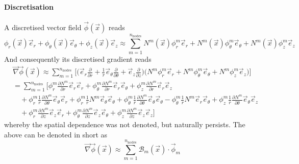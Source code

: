 \documentclass[times,namecite]{goose-article}
\begin{document}
\paragraph{Discretisation}

A discretised vector field $\vec{\phi}(\vec{x})$ reads
\begin{equation}
  \phi_r (\vec{x}) \vec{e}_r + \phi_\theta (\vec{x}) \vec{e}_\theta + \phi_z (\vec{x}) \vec{e}_z
  \approx
  \sum\limits_{m=1}^{n_\mathrm{nodes}}
  N^m (\vec{x}) \phi^{m}_{r}       \vec{e}_r      +
  N^m (\vec{x}) \phi^{m}_{\theta}  \vec{e}_\theta +
  N^m (\vec{x}) \phi^{m}_{z}       \vec{e}_z
\end{equation}
And consequently its discretised gradient reads
\begin{align}
  &\vec{\nabla} \vec{\phi} (\vec{x})
  \approx
  \sum\limits_{m=1}^{n_\mathrm{nodes}}
  \Bigg[
  \bigg(
  \vec{e}_r \frac{\partial}{\partial r} +
  \frac{1}{r} \vec{e}_\theta \frac{\partial}{\partial \theta} +
  \vec{e}_z \frac{\partial}{\partial z}
  \bigg)
  \bigg(
  N^m \phi^{m}_{r}       \vec{e}_r      +
  N^m \phi^{m}_{\theta}  \vec{e}_\theta +
  N^m \phi^{m}_{z}       \vec{e}_z
  \bigg)
  \Bigg]
  \\
  &=
  \sum\limits_{m=1}^{n_\mathrm{nodes}}
  \Bigg[
    \phi^{m}_{r     } \frac{\partial N^m}{\partial r} \vec{e}_r \vec{e}_r
  + \phi^{m}_{\theta} \frac{\partial N^m}{\partial r} \vec{e}_r \vec{e}_\theta
  + \phi^{m}_{z     } \frac{\partial N^m}{\partial r} \vec{e}_r \vec{e}_z
  \nonumber
  \\
  &\quad
  + \phi^{m}_{r     } \frac{1}{r} \frac{\partial N^m}{\partial \theta} \vec{e}_\theta \vec{e}_r
  + \phi^{m}_{r     } \frac{1}{r} N^m                                  \vec{e}_\theta \vec{e}_\theta
  + \phi^{m}_{\theta} \frac{1}{r} \frac{\partial N^m}{\partial \theta} \vec{e}_\theta \vec{e}_\theta
  - \phi^{m}_{\theta} \frac{1}{r} N^m                                  \vec{e}_r      \vec{e}_\theta
  + \phi^{m}_{z     } \frac{1}{r} \frac{\partial N^m}{\partial \theta} \vec{e}_\theta \vec{e}_z
  \nonumber
  \\
  &\quad
  + \phi^{m}_{r     } \frac{\partial N^m }{\partial z} \vec{e}_z \vec{e}_r
  + \phi^{m}_{\theta} \frac{\partial N^m }{\partial z} \vec{e}_z \vec{e}_\theta
  + \phi^{m}_{z     } \frac{\partial N^m }{\partial z} \vec{e}_z \vec{e}_z
  \Bigg]
\end{align}
whereby the spatial dependence was not denoted, but naturally persists. The above can be denoted in short as
\begin{equation}
  \vec{\nabla} \vec{\phi} (\vec{x})
  \approx
  \sum\limits_{m=1}^{n_\mathrm{nodes}}
  \mathcal{B}_m (\vec{x}) \cdot \vec{\phi}_m
\end{equation}
\end{document}
